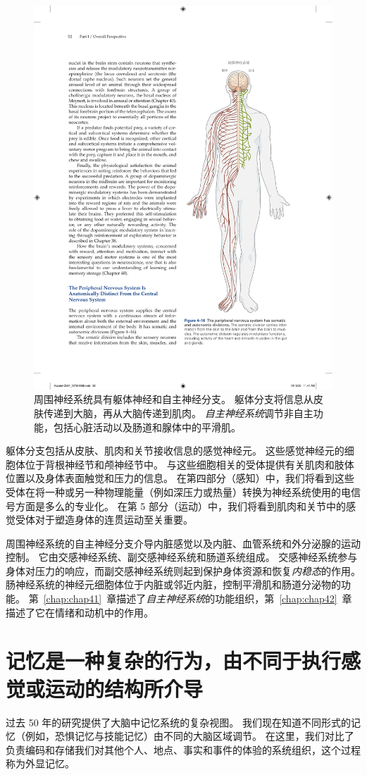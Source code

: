 \begin{figure}[htbp]
	\centering
	\includegraphics[width=0.55\linewidth]{chap04/fig_4_16}
	\caption{周围神经系统具有躯体神经和自主神经分支。
		躯体分支将信息从皮肤传递到大脑，再从大脑传递到肌肉。
		\textit{自主神经系统}调节非自主功能，包括心脏活动以及肠道和腺体中的平滑肌。}
	\label{fig:4_16}
\end{figure}


躯体分支包括从皮肤、肌肉和关节接收信息的感觉神经元。
这些感觉神经元的细胞体位于背根神经节和颅神经节中。 
与这些细胞相关的受体提供有关肌肉和肢体位置以及身体表面触觉和压力的信息。
在第四部分（感知）中，我们将看到这些受体在将一种或另一种物理能量（例如深压力或热量）转换为神经系统使用的电信号方面是多么的专业化。
在第 5 部分（运动）中，我们将看到肌肉和关节中的感觉受体对于塑造身体的连贯运动至关重要。


周围神经系统的自主神经分支介导内脏感觉以及内脏、血管系统和外分泌腺的运动控制。
它由交感神经系统、副交感神经系统和肠道系统组成。 
交感神经系统参与身体对压力的响应，而副交感神经系统则起到保护身体资源和恢复\textit{内稳态}的作用。
肠神经系统的神经元细胞体位于内脏或邻近内脏，控制平滑肌和肠道分泌物的功能。
第~\ref{chap:chap41}~章描述了\textit{自主神经系统}的功能组织，第~\ref{chap:chap42}~章描述了它在情绪和动机中的作用。



\section{记忆是一种复杂的行为，由不同于执行感觉或运动的结构所介导}

过去 50 年的研究提供了大脑中记忆系统的复杂视图。 
我们现在知道不同形式的记忆（例如，恐惧记忆与技能记忆）由不同的大脑区域调节。
在这里，我们对比了负责编码和存储我们对其他个人、地点、事实和事件的体验的系统组织，这个过程称为外显记忆。


